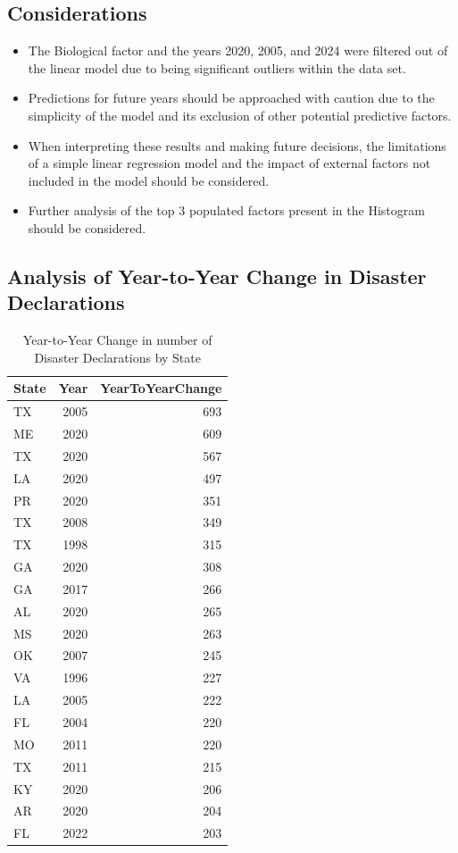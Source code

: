 \documentclass[12pt]{report}\usepackage[]{graphicx}\usepackage[]{xcolor}
\begin{document}
\subsection*{Considerations}
\begin{itemize}
    \item The Biological factor and the years 2020, 2005, and 2024 were filtered out of the linear model due to being significant outliers within the data set.
    \item Predictions for future years should be approached with caution due to the simplicity of the model and its exclusion of other potential predictive factors.
    \item When interpreting these results and making future decisions, the limitations of a simple linear regression model and the impact of external factors not included in the model should be considered.
    \item Further analysis of the top 3 populated factors present in the Histogram should be considered.
\end{itemize}
\subsection*{Analysis of Year-to-Year Change in Disaster Declarations}
\begin{table}[ht]
\centering
\caption{Year-to-Year Change in number of Disaster Declarations by State}
\label{tab:disaster_changes}
\begin{tabular}{lrr}
\toprule
State & Year & YearToYearChange \\
\midrule
TX & 2005 & 693 \\
ME & 2020 & 609 \\
TX & 2020 & 567 \\
LA & 2020 & 497 \\
PR & 2020 & 351 \\
TX & 2008 & 349 \\
TX & 1998 & 315 \\
GA & 2020 & 308 \\
GA & 2017 & 266 \\
AL & 2020 & 265 \\
MS & 2020 & 263 \\
OK & 2007 & 245 \\
VA & 1996 & 227 \\
LA & 2005 & 222 \\
FL & 2004 & 220 \\
MO & 2011 & 220 \\
TX & 2011 & 215 \\
KY & 2020 & 206 \\
AR & 2020 & 204 \\
FL & 2022 & 203 \\
\bottomrule
\end{tabular}
\end{table}
\end{document}
